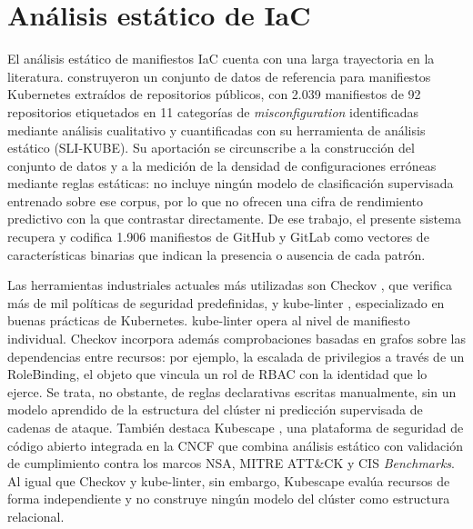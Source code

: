 \section{Análisis estático de IaC}
\label{sec:iac}

El análisis estático de manifiestos \ac{IaC} cuenta con una larga trayectoria en la
literatura. \citet{Rahman2022} construyeron un conjunto de datos
de referencia para manifiestos Kubernetes extraídos de repositorios
públicos, con 2.039 manifiestos de 92 repositorios etiquetados en 11 categorías de
\textit{misconfiguration} identificadas mediante análisis cualitativo y cuantificadas
con su herramienta de análisis estático (SLI-KUBE). Su aportación se circunscribe
a la construcción del conjunto de datos y a la medición de la densidad de
configuraciones erróneas mediante reglas estáticas: no incluye ningún modelo de
clasificación supervisada entrenado sobre ese corpus, por lo que no ofrecen una
cifra de rendimiento predictivo con la que contrastar directamente.
De ese trabajo, el presente sistema recupera y codifica 1.906 manifiestos de GitHub y
GitLab como vectores de características binarias que indican la presencia o ausencia
de cada patrón.

Las herramientas industriales actuales más utilizadas son Checkov
\citep{Checkov2021}, que verifica más de mil políticas de seguridad predefinidas, y
kube-linter \citep{KubeLinter2021}, especializado en buenas prácticas de
Kubernetes. kube-linter opera al nivel de manifiesto individual. Checkov incorpora
además comprobaciones basadas en grafos sobre las dependencias entre recursos: por
ejemplo, la escalada de privilegios a través de un RoleBinding, el objeto que
vincula un rol de \ac{RBAC} con la identidad que lo ejerce. Se trata,
no obstante, de reglas declarativas escritas manualmente, sin un modelo aprendido
de la estructura del clúster ni predicción supervisada de cadenas de ataque.
También destaca
Kubescape \citep{Kubescape2021}, una plataforma de seguridad de código
abierto integrada en la \ac{CNCF} que combina
análisis estático con validación de cumplimiento contra los marcos \ac{NSA}, MITRE ATT\&CK
y \ac{CIS} \textit{Benchmarks}. Al igual que Checkov y kube-linter, sin embargo, Kubescape
evalúa recursos de forma independiente y no construye ningún modelo del clúster como
estructura relacional.

